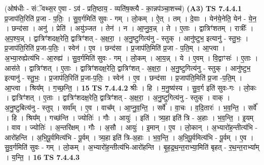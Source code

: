 \documentclass[17pt]{extarticle}
\begin{document}
                  \newline
                      (ओष॑धीः - संॅवथ्स॒र ए॒वा - ऽव॑ - प्रति॒ष्ठाय॒ - व्यति॑ष॒क्त्यै - का॒न्नप॑ञ्चा॒शच्च॑)  \textbf{(A3)} \newline \newline
                                \textbf{ TS 7.4.4.1} \newline
                  प्र॒जाप॑ति॒रिति॑ प्र॒जा - प॒तिः॒ । सु॒व॒र्गमिति॑ सुवः - गम् । लो॒कम् । ऐ॒त् । तम् । दे॒वाः । येन॑ये॒नेति॒ येन॑ - ये॒न॒ । छन्द॑सा । अनु॑ । प्रेति॑ । अयु॑ञ्जत । तेन॑ । न । आ॒प्नु॒व॒न्न् । ते । ए॒ताः । द्वात्रिꣳ॑शतम् । रात्रीः᳚ । अ॒प॒श्य॒न्न् । द्वात्रिꣳ॑शदक्ष॒रेति॒ द्वात्रिꣳ॑शत् - अ॒क्ष॒रा॒ । अ॒नु॒ष्टुगित्य॑नु - स्तुक् । आनु॑ष्टुभ॒ इत्यानु॑ - स्तु॒भः॒ । प्र॒जाप॑ति॒रिति॑ प्र॒जा-प॒तिः॒ । स्वेन॑ । ए॒व । छन्द॑सा । प्र॒जाप॑ति॒मिति॑ प्र॒जा - प॒ति॒म् । आ॒प्त्वा । अ॒भ्या॒रुह्येत्य॑भि - आ॒रुह्य॑ । सु॒व॒र्गमिति॑ सुवः - गम् । लो॒कम् । आ॒य॒न्न् । ये । ए॒वम् । वि॒द्वाꣳसः॑ । ए॒ताः । आस॑ते । द्वात्रिꣳ॑शत् । ए॒ताः । द्वात्रिꣳ॑शदक्ष॒रेति॒ द्वात्रिꣳ॑शत् - अ॒क्ष॒रा॒ । अ॒नु॒ष्टुगित्य॑नु - स्तुक् । आनु॑ष्टुभ॒ इत्यानु॑ - स्तु॒भः॒ । प्र॒जाप॑ति॒रिति॑ प्र॒जा-प॒तिः॒ । स्वेन॑ । ए॒व । छन्द॑सा । प्र॒जाप॑ति॒मिति॑ प्र॒जा -प॒ति॒म् । आ॒प्त्वा । श्रिय᳚म् । ग॒च्छ॒न्ति॒ । \textbf{  15} \newline
                  \newline
                                \textbf{ TS 7.4.4.2} \newline
                  श्रीः । हि । म॒नु॒ष्य॑स्य । सु॒व॒र्ग इति॑ सुवः-गः । लो॒कः । द्वात्रिꣳ॑शत् । ए॒ताः । द्वात्रिꣳ॑शदक्ष॒रेति॒ द्वात्रिꣳ॑शत् - अ॒क्ष॒रा॒ । अ॒नु॒ष्टुगित्य॑नु - स्तुक् । वाक् । अ॒नु॒ष्टुबित्य॑नु - स्तुप् । सर्वा᳚म् । ए॒व । वाच᳚म् । आ॒प्नु॒व॒न्ति॒ । सर्वे᳚ । वा॒चः । व॒दि॒तारः॑ । भ॒व॒न्ति॒ । सर्वे᳚ । हि । श्रिय᳚म् । गच्छ॑न्ति । ज्योतिः॑ । गौः । आयुः॑ । इति॑ । त्र्य॒हा इति॑ त्रि - अ॒हाः । भ॒व॒न्ति॒ । इ॒यम् । वाव । ज्योतिः॑ । अ॒न्तरि॑क्षम् । गौः । अ॒सौ । आयुः॑ । इ॒मान् । ए॒व । लो॒कान् । अ॒भ्यारो॑ह॒न्तीत्य॑भि - आरो॑हन्ति । अ॒भि॒पू॒र्वमित्य॑भि - पू॒र्वम् । त्र्य॒हा इति॑ त्रि-अ॒हाः । भ॒व॒न्ति॒ । अ॒भि॒पू॒र्वमित्य॑भि - पू॒र्वम् । ए॒व । सु॒व॒र्गमिति॑ सुवः - गम् । लो॒कम् । अ॒भ्यारो॑ह॒न्तीत्य॑भि-आरो॑हन्ति । बृ॒ह॒द्र॒थ॒न्त॒राभ्या॒मिति॑ बृहत् - र॒थ॒न्त॒राभ्या᳚म् । य॒न्ति॒ । \textbf{  16} \newline
                  \newline
                                \textbf{ TS 7.4.4.3} \newline
\end{document}
